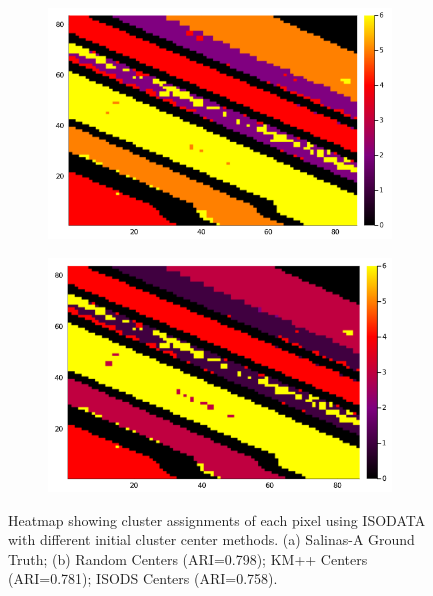 \documentclass[a4paper, 10pt]{article}
\begin{document}
\begin{figure}[ht]
\begin{subfigure}[b]{0.24\textwidth}
            \includegraphics[width=\linewidth]{kisodata.png}
            \caption{}
            \label{fig:salinask}
      \end{subfigure}
      \begin{subfigure}[b]{0.24\textwidth}
            \centering
            \includegraphics[width=\linewidth]{iisodata.png}
            \caption{}
            \label{fig:salinasi}
      \end{subfigure}\hfill \caption{Heatmap showing cluster assignments of each
            pixel using ISODATA with different initial cluster center methods.
            (a) Salinas-A Ground Truth; (b) Random Centers (ARI=0.798); KM++
            Centers (ARI=0.781); ISODS Centers (ARI=0.758).}
      \label{fig:salinas}
\end{figure}

\end{document}
